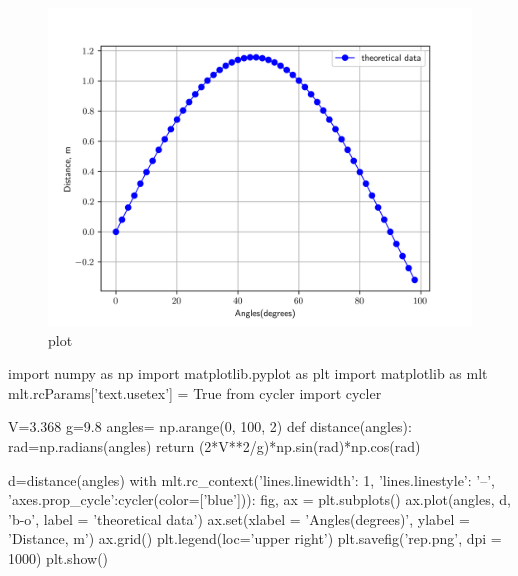 \documentclass[11pt]{article}
\begin{document}
\begin{figure}[H]
    \centering
    \includegraphics[width=1\linewidth]{rep.png}
    \caption{plot}
    \label{fig:erep}
\end{figure}

\begin{python}


import numpy as np
import matplotlib.pyplot as plt
import matplotlib as mlt
mlt.rcParams['text.usetex'] = True
from cycler import cycler

V=3.368
g=9.8
angles= np.arange(0, 100, 2)
def distance(angles):
    rad=np.radians(angles)
    return (2*V**2/g)*np.sin(rad)*np.cos(rad)

d=distance(angles)
with mlt.rc_context({'lines.linewidth': 1, 'lines.linestyle': '--', 'axes.prop_cycle':cycler(color=['blue'])}):
    fig, ax = plt.subplots()
    ax.plot(angles, d, 'b-o', label = 'theoretical data')
    ax.set(xlabel = 'Angles(degrees)', ylabel = 'Distance, m')
    ax.grid()
    plt.legend(loc='upper right')
    plt.savefig('rep.png', dpi = 1000)
    plt.show()
\end{python}
\end{document}
